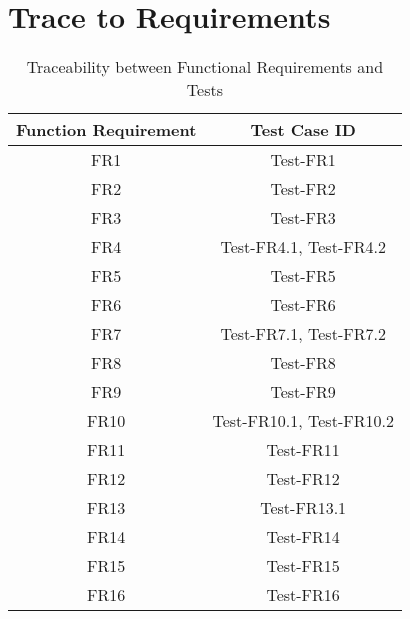 \documentclass[12pt, titlepage]{article}
\begin{document}
\section{Trace to Requirements}
\begin{table}[H]
    \centering
    \begin{tabular}{|c|c|}
    \hline
    Function Requirement     &  Test Case ID\\
    \hline
    FR1     & Test-FR1\\
    \hline
    FR2 & Test-FR2\\
    \hline
    FR3 & Test-FR3\\
    \hline
     FR4 & Test-FR4.1, Test-FR4.2\\
    \hline
     FR5 & Test-FR5\\
    \hline
     FR6 & Test-FR6\\
    \hline
     FR7 & Test-FR7.1, Test-FR7.2\\
    \hline
     FR8 & Test-FR8\\
    \hline
     FR9 & Test-FR9\\
    \hline
     FR10 & Test-FR10.1, Test-FR10.2\\
    \hline
     FR11 & Test-FR11\\
    \hline 
     FR12 & Test-FR12\\
    \hline
    FR13 & Test-FR13.1\\
    \hline
    FR14 & Test-FR14\\
    \hline
    FR15 & Test-FR15\\
    \hline
    FR16 & Test-FR16\\
    \hline
    \end{tabular}
    \caption{Traceability between Functional Requirements and Tests}
\end{table}
\end{document}
